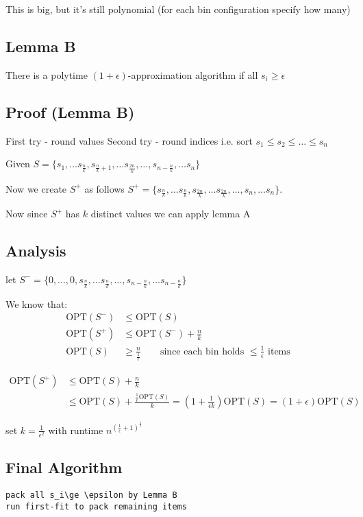 \documentclass[english,12pt]{article}
\theoremstyle{plain}
\theoremstyle{definition}
\theoremstyle{definition} %
\begin{document}
This is big, but it's still polynomial (for each bin configuration specify how many)

\subsection{Lemma B}
There is a polytime $(1+\epsilon)$-approximation algorithm if all $s_i\ge\epsilon$

\subsection{Proof (Lemma B)}
First try - round values
Second try - round indices
i.e. sort $s_1\le s_2\le \ldots\le s_n$

Given $S=\{s_1,\ldots s_{\frac{n}{k}},s_{\frac{n}{k}+1},\ldots s_{\frac{2n}{k}},\ldots,s_{n-\frac{n}{k}},\ldots s_{n}\}$

Now we create $S^+$ as follows $S^+=\{s_{\frac{n}{k}},\ldots s_{\frac{n}{k}},s_{\frac{2n}{k}},\ldots s_{\frac{2n}{k}},\ldots,s_{n},\ldots s_{n}\}$.

Now since $S^+$ has $k$ distinct values we can apply lemma A

\subsection{Analysis}
let $S^-=\{0,\ldots, 0,s_{\frac{n}{k}},\ldots s_{\frac{n}{k}},\ldots,s_{n-\frac{n}{k}},\ldots s_{n-\frac{n}{k}}\}$

We know that:
\begin{align*}
\text{OPT}(S^-) &\le \text{OPT}(S)\\
\text{OPT}(S^+) &\le \text{OPT}(S^-)+\frac{n}{k}\\
\text{OPT}(S) &\ge \frac{n}{\frac{1}{\epsilon}}\qquad \text{since each bin holds }\le \frac{1}{\epsilon}\text{ items}
\end{align*}

\begin{align*}
\text{OPT}(S^+)&\le \text{OPT}(S) +\frac{n}{k}\\
&\le \text{OPT}(S)+\frac{\frac{1}{\epsilon}\text{OPT}(S)}{k}
=\left(1+\frac{1}{\epsilon k}\right)\text{OPT}(S)
=(1+\epsilon)\text{OPT}(S)
\end{align*}

set $k=\frac{1}{\epsilon^2}$ with runtime $n^{(\frac{1}{\epsilon}+1)^{\frac{1}{\epsilon}}}$

\subsection{Final Algorithm}
\begin{verbatim}
pack all s_i\ge \epsilon by Lemma B
run first-fit to pack remaining items
\end{verbatim}
\end{document}

